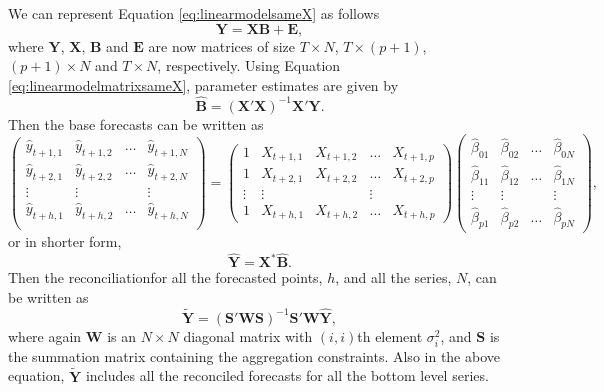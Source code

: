 \documentclass[11pt,a4paper,]{article}
\begin{document}
We can represent Equation \eqref{eq:linearmodelsameX} as follows
\begin{equation}\label{eq:linearmodelmatrixsameX}
\bm{Y}= \bm{X} \bm{B} + \bm{E},
\end{equation} where \(\bm{Y}\), \(\bm{X}\), \(\bm{B}\) and \(\bm{E}\)
are now matrices of size \(T\times N\), \(T\times (p+1)\),
\((p+1)\times N\) and \(T \times N\), respectively. Using Equation
\eqref{eq:linearmodelmatrixsameX}, parameter estimates are given by
\begin{equation}
\hat{\bm{B}} = (\bm{X}'\bm{X})^{-1} \bm{X}'\bm{Y}.
\end{equation} Then the base forecasts can be written as
\begin{equation}
\begin{pmatrix}
 \hat{y}_{t+1,1} & \hat{y}_{t+1,2} & \dots & \hat{y}_{t+1,N}\\
 \hat{y}_{t+2,1} & \hat{y}_{t+2,2} & \dots & \hat{y}_{t+2,N}\\
 \vdots & \vdots & & \vdots\\
 \hat{y}_{t+h,1} & \hat{y}_{t+h,2} & \dots & \hat{y}_{t+h,N}\\
 \end{pmatrix} =
 \begin{pmatrix}
 1 & X_{t+1,1} & X_{t+1,2} & \dots & X_{t+1,p}\\
 1 & X_{t+2,1} & X_{t+2,2} & \dots & X_{t+2,p}\\
 \vdots & \vdots & & \vdots\\
 1 & X_{t+h,1} & X_{t+h,2} & \dots & X_{t+h,p}
 \end{pmatrix}
 \begin{pmatrix}
 \hat\beta_{01} & \hat\beta_{02} & \dots & \hat\beta_{0N}\\
 \hat\beta_{11} & \hat\beta_{12} & \dots & \hat\beta_{1N}\\
 \vdots & \vdots & & \vdots\\
 \hat\beta_{p1} & \hat\beta_{p2} & \dots & \hat\beta_{pN}
 \end{pmatrix},
\end{equation} or in shorter form,
\begin{equation}\label{eq:baseforecatssameX}
\hat{\bm{Y}} = \bm{X}^* \hat{\bm{B}}.
\end{equation} Then the reconciliationfor all the forecasted points,
\(h\), and all the series, \(N\), can be written as
\begin{equation}\label{eq:recforecastssameX}
\tilde{\bm{Y}} = (\bm{S}'\bm{W}\bm{S})^{-1}\bm{S}'\bm{W} \hat{\bm{Y}},
\end{equation} where again \(\bm{W}\) is an \(N\times N\) diagonal
matrix with \((i,i)\)th element \(\sigma_i^2\), and \(\bm{S}\) is the
summation matrix containing the aggregation constraints. Also in the
above equation, \(\tilde{\bm{Y}}\) includes all the reconciled forecasts
for all the bottom level series.
\end{document}
